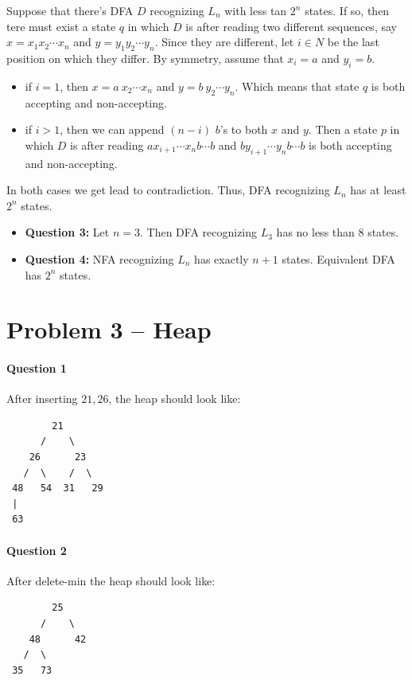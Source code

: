 Suppose that there's DFA $D$ recognizing $L_n$ with less tan $2^n$ states.
If so, then tere must exist a state $q$ in which $D$ is after reading two different sequences, say $x = x_1x_2\cdots x_n$ and $y = y_1y_2\cdots y_n$.
Since they are different, let $i\in N$ be the last position on which they differ.
By symmetry, assume that $x_i = a$ and $y_i = b$.
\begin{itemize}
    \item if $i = 1$, then $x = a\:x_2\cdots x_n$ and $y = b\:y_2\cdots y_n$.
    Which means that state $q$ is both accepting and non-accepting.
    \item if $i > 1$, then we can append $(n-i)$ $b$'s to both $x$ and $y$. 
    Then a state $p$ in which $D$ is after reading $ax_{i+1}\cdots x_nb\cdots b$ and $by_{i+1}\cdots y_nb\cdots b$ is both accepting and non-accepting.
\end{itemize}
In both cases we get lead to contradiction.
Thus, DFA recognizing $L_n$ has at least $2^n$ states.

\begin{itemize}
    \item \textbf{Question 3:} Let $n = 3$. Then DFA recognizing $L_3$ has no less than $8$ states.
    \item \textbf{Question 4:} NFA recognizing $L_n$ has exactly $n+1$ states.
    Equivalent DFA has $2^n$ states.
\end{itemize}


\section{Problem 3 – Heap}
\paragraph{Question 1}
After inserting $21, 26$, the heap should look like:
\begin{verbatim}
        21
      /    \
    26      23
   /  \    /  \
 48   54  31   29
 |
 63
\end{verbatim}

\paragraph{Question 2}
After delete-min the heap should look like:
\begin{verbatim}
        25
      /    \
    48      42
   /  \
 35   73
\end{verbatim}


